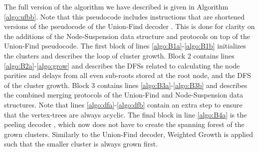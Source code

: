 The full version of the algorithm we have described is given in Algorithm \ref{algo:ufbb}. Note that this pseudocode includes instructions that are shortened versions of the pseudocode of the Union-Find decoder \cite{delfosse2017almost}. This is done for clarity on the additions of the Node-Suspension data structure and protocols on top of the Union-Find pseudocode. The first block of lines \ref{algo:B1a}-\ref{algo:B1b} initializes the clusters and describes the loop of cluster growth. Block 2 contains lines \ref{algo:B2a}-\ref{algo:grow} and describes the DFSs related to calculating the node parities and delays from all even sub-roots stored at the root node, and the DFS of the cluster growth. Block 3 contains lines \ref{algo:B3a}-\ref{algo:B3b} and describes the combined merging protocols of the Union-Find and Node-Suspension data structures. Note that lines \ref{algo:dfa}-\ref{algo:dfb} contain an extra step to ensure that the vertex-trees are always acyclic. The final block in line \ref{algo:B4a} is the peeling decoder \cite{delfosse2017linear}, which now does not have to create the spanning forest of the grown clusters. Similarly to the Union-Find decoder, Weighted Growth is applied such that the smaller cluster is always grown first. 
